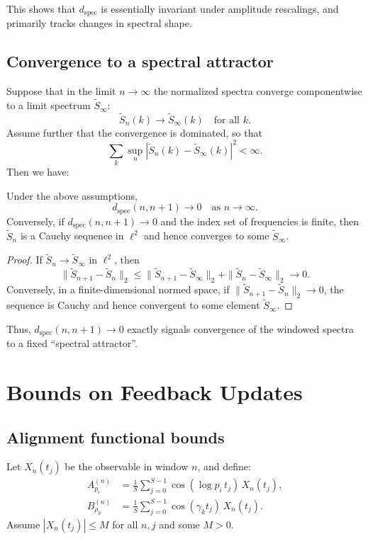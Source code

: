 \documentclass[11pt]{article}
\begin{document}
This shows that $d_{\text{spec}}$ is essentially invariant under amplitude rescalings, and primarily tracks changes in spectral shape.

\subsection{Convergence to a spectral attractor}

Suppose that in the limit $n\to\infty$ the normalized spectra converge componentwise to a limit spectrum $\tilde{S}_\infty$:
\[
\tilde{S}_n(k) \to \tilde{S}_\infty(k)\quad \text{for all }k.
\]
Assume further that the convergence is dominated, so that
\[
\sum_k \sup_n |\tilde{S}_n(k) - \tilde{S}_\infty(k)|^2 < \infty.
\]
Then we have:

\begin{proposition}
Under the above assumptions,
\[
d_{\text{spec}}(n,n+1) \to 0 \quad \text{as } n\to\infty.
\]
Conversely, if $d_{\text{spec}}(n,n+1)\to 0$ and the index set of frequencies is finite, then $\tilde{S}_n$ is a Cauchy sequence in $\ell^2$ and hence converges to some $\tilde{S}_\infty$.
\end{proposition}

\begin{proof}
If $\tilde{S}_n \to \tilde{S}_\infty$ in $\ell^2$, then
\[
\|\tilde{S}_{n+1} - \tilde{S}_n\|_2 \le \|\tilde{S}_{n+1} - \tilde{S}_\infty\|_2 + \|\tilde{S}_n - \tilde{S}_\infty\|_2 \to 0.
\]
Conversely, in a finite-dimensional normed space, if $\|\tilde{S}_{n+1} - \tilde{S}_{n}\|_2 \to 0$, the sequence is Cauchy and hence convergent to some element $\tilde{S}_\infty$.
\end{proof}

Thus, $d_{\text{spec}}(n,n+1)\to 0$ exactly signals convergence of the windowed spectra to a fixed “spectral attractor”.

\section{Bounds on Feedback Updates}

\subsection{Alignment functional bounds}

Let $X_n(t_j)$ be the observable in window $n$, and define:
\begin{align*}
A_{p_i}^{(n)} &= \frac{1}{S}\sum_{j=0}^{S-1} \cos(\log p_i \, t_j)\, X_n(t_j), \\
B_{\rho_k}^{(n)} &= \frac{1}{S}\sum_{j=0}^{S-1} \cos(\gamma_k t_j)\, X_n(t_j).
\end{align*}
Assume $|X_n(t_j)|\le M$ for all $n,j$ and some $M>0$.
\end{document}
